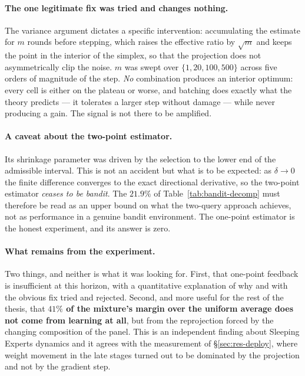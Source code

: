 \documentclass[12pt,a4paper,oneside]{report}
\renewcommand{\_}{\oldunderscore\allowbreak}
\theoremstyle{definition}
\theoremstyle{plain}
\theoremstyle{remark}
\begin{document}
\paragraph{The one legitimate fix was tried and changes nothing.} The variance argument dictates a
specific intervention: accumulating the estimate for $m$ rounds before stepping, which raises the
effective ratio by $\sqrt{m}$ and keeps the point in the interior of the simplex, so that the
projection does not asymmetrically clip the noise. $m$ was swept over $\{1,20,100,500\}$ across
five orders of magnitude of the step. \emph{No} combination produces an interior optimum: every
cell is either on the plateau or worse, and batching does exactly what the theory predicts ---
it tolerates a larger step without damage --- while never producing a gain. The signal is not
there to be amplified.

\paragraph{A caveat about the two-point estimator.} Its shrinkage parameter was driven by the
selection to the lower end of the admissible interval. This is not an accident but what is to be
expected: as $\delta\to 0$ the finite difference converges to the exact directional derivative, so
the two-point estimator \emph{ceases to be bandit}. The $21.9\%$ of Table~\ref{tab:bandit-decomp}
must therefore be read as an upper bound on what the two-query approach achieves, not as
performance in a genuine bandit environment. The one-point estimator is the honest experiment, and
its answer is zero.

\paragraph{What remains from the experiment.} Two things, and neither is what it was looking for.
First, that one-point feedback is insufficient at this horizon, with a quantitative explanation of
why and with the obvious fix tried and rejected. Second, and more useful for the rest of the
thesis, that \textbf{$41\%$ of the mixture's margin over the uniform average does not come from
learning at all}, but from the reprojection forced by the changing composition of the panel. This
is an independent finding about Sleeping Experts dynamics and it agrees with the measurement of
\S\ref{sec:res-deploy}, where weight movement in the late stages turned out to be dominated by the
projection and not by the gradient step.
\end{document}

